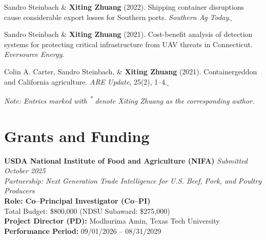 \documentclass[10.8 pt,letterpaper]{article}
\newcommand{\paperlink}[1]{\href{#1}{\,\small\faExternalLink}}
\renewenvironment{itemize}{
	\begin{list}{}{
			\setlength{\leftmargin}{1.5em}
		}
	}{
	\end{list}
}
\begin{document}
\begin{itemize}
		\item[-] Sandro Steinbach \& \textbf{Xiting Zhuang} (2022). Shipping container disruptions cause considerable export losses for Southern ports. \textit{Southern Ag Today}.\paperlink{https://southernagtoday.org/2022/04/shipping-container-disruptions-cause-considerable-export-losses-for-southern-ports/}
		
		\item[-] Sandro Steinbach \& \textbf{Xiting Zhuang} (2021). Cost-benefit analysis of detection systems for protecting critical infrastructure from UAV threats in Connecticut. \textit{Eversource Energy}.
		\item[-] Colin A. Carter, Sandro Steinbach, \& \textbf{Xiting Zhuang} (2021). Containergeddon and California agriculture. \textit{ARE Update}, 25(2), 1--4.\paperlink{https://giannini.ucop.edu/publications/are-update/issues/2021/25/2/containergeddon-and-california-agriculture/}
	\end{itemize}
	
	
	\begin{footnotesize}
		\textit{Note: Entries marked with \textsuperscript{*} denote Xiting Zhuang as the corresponding author.}
	\end{footnotesize}
	
	
	\section*{\textbf{Grants and Funding}}
	
	\begin{itemize}
		\item[-] \textbf{USDA National Institute of Food and Agriculture (NIFA)} \hfill \textit{Submitted October 2025} \\
		\textit{Partnership: Next Generation Trade Intelligence for U.S. Beef, Pork, and Poultry Producers} \\
		\textbf{Role: Co–Principal Investigator (Co–PI)} \\
		Total Budget: \$800,000 \hfill (NDSU Subaward: \$275,000) \\
		\textbf{Project Director (PD):} Modhurima Amin, Texas Tech University \\
		\textbf{Performance Period:} 09/01/2026 – 08/31/2029 \\
	\end{itemize}
	
	
\end{document}
